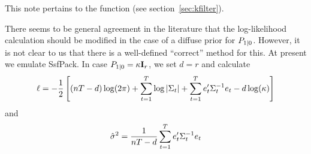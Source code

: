 \documentclass[a4paper]{article}
\begin{document}
This note pertains to the  function (see
section~\ref{sec:kfilter}). 

There seems to be general agreement in the literature that the
log-likelihood calculation should be modified in the case of a diffuse
prior for $P_{1|0}$.  However, it is not clear to us that
there is a well-defined ``correct'' method for this.  At present we
emulate \textsf{SsfPack}.  In case
$P_{1|0} = \kappa \mathbf{I}_r$, we set $d = r$ and calculate
%
\[
  \ell = -\frac{1}{2} \left[(nT-d) \log(2 \pi) + 
    \sum_{t=1}^T\log \left|\Sigma_t\right| + 
    \sum_{t=1}^Te_t'\Sigma_t^{-1} e_t
    - d \log(\kappa)
  \right]
\]
%
and
%
\[
\hat{\sigma}^2 = \frac{1}{nT-d} 
   \sum_{t=1}^Te_t'\Sigma_t^{-1} e_t
\]




 
\end{document}
